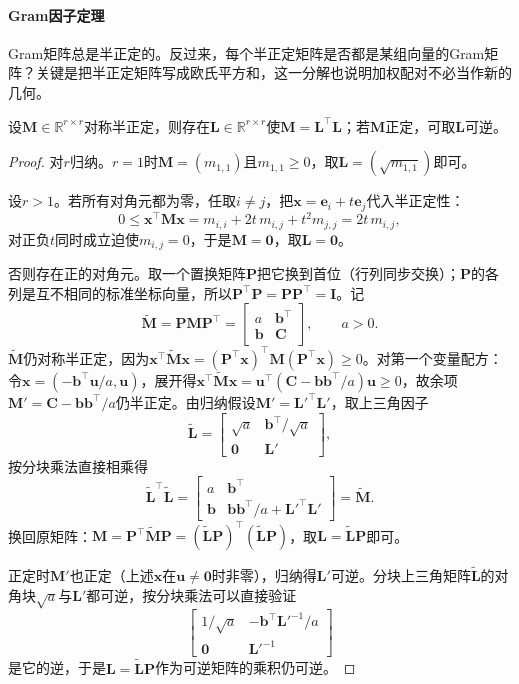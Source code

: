 \paragraph{Gram因子定理}
Gram矩阵总是半正定的。反过来，每个半正定矩阵是否都是某组向量的Gram矩阵？关键是把半正定矩阵写成欧氏平方和，这一分解也说明加权配对不必当作新的几何。
\begin{theorem}[半正定矩阵的配方因子]
\label{thm:ls-gram-factor}
设$\bm M\in\mathbb R^{r\times r}$对称半正定，则存在$\bm L\in\mathbb R^{r\times r}$使$\bm M=\bm L^\top\bm L$；若$\bm M$正定，可取$\bm L$可逆。
\end{theorem}
\begin{proof}
对$r$归纳。$r=1$时$\bm M=(m_{1,1})$且$m_{1,1}\geq0$，取$\bm L=(\sqrt{m_{1,1}})$即可。

设$r>1$。若所有对角元都为零，任取$i\neq j$，把$\bm x=\bm e_i+t\bm e_j$代入半正定性：
\[
 0\leq\bm x^\top\bm M\bm x=m_{i,i}+2t\,m_{i,j}+t^2m_{j,j}=2t\,m_{i,j},
\]
对正负$t$同时成立迫使$m_{i,j}=0$，于是$\bm M=\bm0$，取$\bm L=\bm0$。

否则存在正的对角元。取一个置换矩阵$\bm P$把它换到首位（行列同步交换）；$\bm P$的各列是互不相同的标准坐标向量，所以$\bm P^\top\bm P=\bm P\bm P^\top=\bm I$。记
\[
 \widetilde{\bm M}=\bm P\bm M\bm P^\top
 =\begin{bmatrix}a&\bm b^\top\\ \bm b&\bm C\end{bmatrix},\qquad a>0.
\]
$\widetilde{\bm M}$仍对称半正定，因为$\bm x^\top\widetilde{\bm M}\bm x=(\bm P^\top\bm x)^\top\bm M(\bm P^\top\bm x)\geq0$。对第一个变量配方：令$\bm x=(-\bm b^\top\bm u/a,\bm u)$，展开得$\bm x^\top\widetilde{\bm M}\bm x=\bm u^\top(\bm C-\bm b\bm b^\top/a)\bm u\geq0$，故余项$\bm M'=\bm C-\bm b\bm b^\top/a$仍半正定。由归纳假设$\bm M'=\bm L'^\top\bm L'$，取上三角因子
\[
 \widetilde{\bm L}=\begin{bmatrix}\sqrt a&\bm b^\top/\sqrt a\\ \bm0&\bm L'\end{bmatrix},
\]
按分块乘法直接相乘得
\[
 \widetilde{\bm L}^\top\widetilde{\bm L}
 =\begin{bmatrix}a&\bm b^\top\\ \bm b&\bm b\bm b^\top/a+\bm L'^\top\bm L'\end{bmatrix}
 =\widetilde{\bm M}.
\]
换回原矩阵：$\bm M=\bm P^\top\widetilde{\bm M}\bm P=(\widetilde{\bm L}\bm P)^\top(\widetilde{\bm L}\bm P)$，取$\bm L=\widetilde{\bm L}\bm P$即可。

正定时$\bm M'$也正定（上述$\bm x$在$\bm u\neq\bm0$时非零），归纳得$\bm L'$可逆。分块上三角矩阵$\widetilde{\bm L}$的对角块$\sqrt a$与$\bm L'$都可逆，按分块乘法可以直接验证
\[
 \begin{bmatrix}1/\sqrt a&-\bm b^\top\bm L'^{-1}/a\\ \bm0&\bm L'^{-1}\end{bmatrix}
\]
是它的逆，于是$\bm L=\widetilde{\bm L}\bm P$作为可逆矩阵的乘积仍可逆。
\end{proof}
